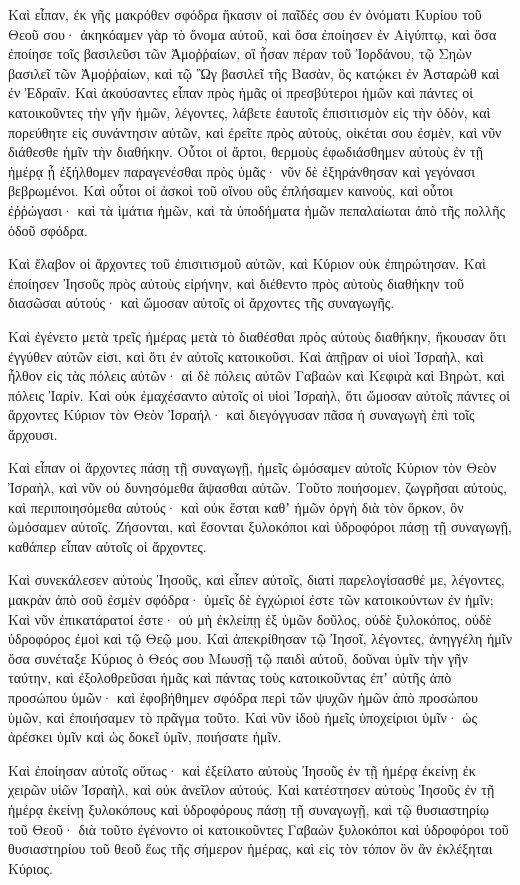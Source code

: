 {Καὶ εἶπαν, ἐκ γῆς μακρόθεν σφόδρα ἥκασιν οἱ παῖδές σου ἐν ὀνόματι Κυρίου τοῦ Θεοῦ σου· ἀκηκόαμεν γὰρ τὸ ὄνομα αὐτοῦ, καὶ ὅσα ἐποίησεν ἐν Αἰγύπτῳ,
καὶ ὅσα ἐποίησε τοῖς βασιλεῦσι τῶν Ἀμοῤῥαίων, οἳ ἦσαν πέραν τοῦ Ἰορδάνου, τῷ Σηὼν βασιλεῖ τῶν Ἀμοῤῥαίων, καὶ τῷ Ὢγ βασιλεῖ τῆς Βασὰν, ὃς κατῴκει ἐν Ἀσταρὼθ καὶ ἐν Ἐδραΐν.
Καὶ ἀκούσαντες εἶπαν πρὸς ἡμᾶς οἱ πρεσβύτεροι ἡμῶν καὶ πάντες οἱ κατοικοῦντες τὴν γῆν ἡμῶν, λέγοντες, λάβετε ἑαυτοῖς ἐπισιτισμὸν εἰς τὴν ὁδὸν, καὶ πορεύθητε εἰς συνάντησιν αὐτῶν, καὶ ἐρεῖτε πρὸς αὐτοὺς, οἰκέται σου ἐσμὲν, καὶ νῦν διάθεσθε ἡμῖν τὴν διαθήκην.
Οὗτοι οἱ ἄρτοι, θερμοὺς ἐφωδιάσθημεν αὐτοὺς ἐν τῇ ἡμέρᾳ ᾗ ἐξήλθομεν παραγενέσθαι πρὸς ὑμᾶς· νῦν δὲ ἐξηράνθησαν καὶ γεγόνασι βεβρωμένοι.
Καὶ οὗτοι οἱ ἀσκοὶ τοῦ οἴνου οὓς ἐπλήσαμεν καινοὺς, καὶ οὗτοι ἐῤῥώγασι· καὶ τὰ ἱμάτια ἡμῶν, καὶ τὰ ὑποδήματα ἡμῶν πεπαλαίωται ἀπὸ τῆς πολλῆς ὁδοῦ σφόδρα.
\par }{\PP {}Καὶ ἔλαβον οἱ ἄρχοντες τοῦ ἐπισιτισμοῦ αὐτῶν, καὶ Κύριον οὐκ ἐπηρώτησαν.
Καὶ ἐποίησεν Ἰησοῦς πρὸς αὐτοὺς εἰρήνην, καὶ διέθεντο πρὸς αὐτοὺς διαθήκην τοῦ διασῶσαι αὐτούς· καὶ ὤμοσαν αὐτοῖς οἱ ἄρχοντες τῆς συναγωγῆς.
\par }{\PP {}Καὶ ἐγένετο μετὰ τρεῖς ἡμέρας μετὰ τὸ διαθέσθαι πρὸς αὐτοὺς διαθήκην, ἤκουσαν ὅτι ἐγγύθεν αὐτῶν εἰσι, καὶ ὅτι ἐν αὐτοῖς κατοικοῦσι.
Καὶ ἀπῇραν οἱ υἱοὶ Ἰσραὴλ, καὶ ἦλθον εἰς τὰς πόλεις αὐτῶν· αἱ δὲ πόλεις αὐτῶν Γαβαὼν καὶ Κεφιρὰ καὶ Βηρὼτ, καὶ πόλεις Ἰαρίν.
Καὶ οὐκ ἐμαχέσαντο αὐτοῖς οἱ υἱοὶ Ἰσραὴλ, ὅτι ὤμοσαν αὐτοῖς πάντες οἱ ἄρχοντες Κύριον τὸν Θεὸν Ἰσραήλ· καὶ διεγόγγυσαν πᾶσα ἡ συναγωγὴ ἐπὶ τοῖς ἄρχουσι.
\par }{\PP {}Καὶ εἶπαν οἱ ἄρχοντες πάσῃ τῇ συναγωγῇ, ἡμεῖς ὠμόσαμεν αὐτοῖς Κύριον τὸν Θεὸν Ἰσραὴλ, καὶ νῦν οὐ δυνησόμεθα ἅψασθαι αὐτῶν.
Τοῦτο ποιήσομεν, ζωγρῆσαι αὐτοὺς, καὶ περιποιησόμεθα αὐτούς· καὶ οὐκ ἔσται καθʼ ἡμῶν ὀργὴ διὰ τὸν ὅρκον, ὃν ὠμόσαμεν αὐτοῖς.
Ζήσονται, καὶ ἔσονται ξυλοκόποι καὶ ὑδροφόροι πάσῃ τῇ συναγωγῇ, καθάπερ εἶπαν αὐτοῖς οἱ ἄρχοντες.
\par }{\PP {}Καὶ συνεκάλεσεν αὐτοὺς Ἰησοῦς, καὶ εἶπεν αὐτοῖς, διατί παρελογίσασθέ με, λέγοντες, μακρὰν ἀπὸ σοῦ ἐσμὲν σφόδρα· ὑμεῖς δὲ ἐγχώριοί ἐστε τῶν κατοικούντων ἐν ἡμῖν;
Καὶ νῦν ἐπικατάρατοί ἐστε· οὐ μὴ ἐκλείπῃ ἐξ ὑμῶν δοῦλος, οὐδὲ ξυλοκόπος, οὐδὲ ὑδροφόρος ἐμοὶ καὶ τῷ Θεῷ μου.
Καὶ ἀπεκρίθησαν τῷ Ἰησοῖ, λέγοντες, ἀνηγγέλη ἡμῖν ὅσα συνέταξε Κύριος ὁ Θεός σου Μωυσῇ τῷ παιδὶ αὐτοῦ, δοῦναι ὑμῖν τὴν γῆν ταύτην, καὶ ἐξολοθρεῦσαι ἡμᾶς καὶ πάντας τοὺς κατοικοῦντας ἐπʼ αὐτῆς ἀπὸ προσώπου ὑμῶν· καὶ ἐφοβήθημεν σφόδρα περὶ τῶν ψυχῶν ἡμῶν ἀπὸ προσώπου ὑμῶν, καὶ ἐποιήσαμεν τὸ πρᾶγμα τοῦτο.
Καὶ νῦν ἰδοὺ ἡμεῖς ὑποχείριοι ὑμῖν· ὡς ἀρέσκει ὑμῖν καὶ ὡς δοκεῖ ὑμῖν, ποιήσατε ἡμῖν.
\par }{\PP {}Καὶ ἐποίησαν αὐτοῖς οὕτως· καὶ ἐξείλατο αὐτοὺς Ἰησοῦς ἐν τῇ ἡμέρᾳ ἐκείνῃ ἐκ χειρῶν υἱῶν Ἰσραὴλ, καὶ οὐκ ἀνεῖλον αὐτούς.
Καὶ κατέστησεν αὐτοὺς Ἰησοῦς ἐν τῇ ἡμέρᾳ ἐκείνῃ ξυλοκόπους καὶ ὑδροφόρους πάσῃ τῇ συναγωγῇ, καὶ τῷ θυσιαστηρίῳ τοῦ Θεοῦ· διὰ τοῦτο ἐγένοντο οἱ κατοικοῦντες Γαβαὼν ξυλοκόποι καὶ ὑδροφόροι τοῦ θυσιαστηρίου τοῦ θεοῦ ἕως τῆς σήμερον ἡμέρας, καὶ εἰς τὸν τόπον ὃν ἂν ἐκλέξηται Κύριος.

}
